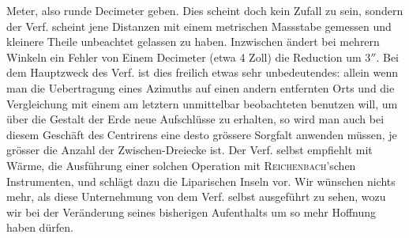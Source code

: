 Meter, also runde Decimeter geben. Dies scheint doch kein Zufall zu sein, sondern der Verf. scheint
jene Distanzen mit einem metrischen Massstabe gemessen und kleinere Theile unbeachtet gelassen zu
haben. Inzwischen ändert bei mehrern Winkeln ein Fehler von Einem Decimeter (etwa 4 Zoll) die
Reduction um $3''$. Bei dem Hauptzweck des Verf. ist dies freilich etwas sehr unbedeutendes: allein
wenn man die Uebertragung eines Azimuths auf einen andern entfernten Orts und die Vergleichung mit
einem am letztern unmittelbar beobachteten benutzen will, um über die Gestalt der Erde neue
Aufschlüsse zu erhalten, so wird man auch bei diesem Geschäft des Centrirens eine desto grössere
Sorgfalt anwenden müssen, je grösser die Anzahl der Zwischen-Dreiecke ist. Der Verf. selbst
empfiehlt mit Wärme, die Ausführung einer solchen Operation mit \textsc{Reichenbach}'schen
Instrumenten, und schlägt dazu die Liparischen Inseln vor. Wir wünschen nichts mehr, als diese
Unternehmung von dem Verf. selbst ausgeführt zu sehen, wozu wir bei der Veränderung seines
bisherigen Aufenthalts um so mehr Hoffnung haben dürfen.

